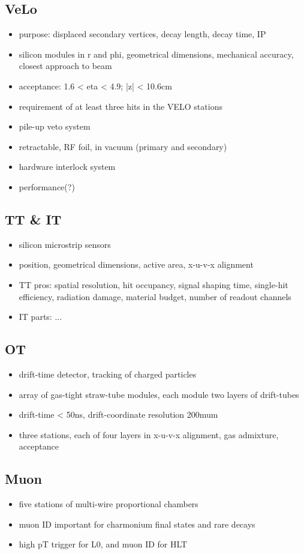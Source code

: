 \subsection{VeLo}
\begin{itemize}
  \item purpose: displaced secondary vertices, decay length, decay time, IP
  \item silicon modules in r and phi, geometrical dimensions, mechanical accuracy, closest approach to beam
  \item acceptance: 1.6 < eta < 4.9; |z| < 10.6cm
  \item requirement of at least three hits in the VELO stations
  \item pile-up veto system
  \item retractable, RF foil, in vacuum (primary and secondary)
  \item hardware interlock system
  \item performance(?)
\end{itemize}
\subsection{TT \& IT}
\begin{itemize}
  \item silicon microstrip sensors
  \item position, geometrical dimensions, active area, x-u-v-x alignment
  \item TT pros: spatial resolution, hit occupancy, signal shaping time, single-hit efficiency, radiation damage, material budget, number of readout channels
  \item IT parts: ...
\end{itemize}
\subsection{OT}
\begin{itemize}
  \item drift-time detector, tracking of charged particles
  \item array of gas-tight straw-tube modules, each module two layers of drift-tubes
  \item drift-time < 50ns, drift-coordinate resolution 200mum
  \item three stations, each of four layers in x-u-v-x alignment, gas admixture, acceptance
\end{itemize}
\subsection{Muon}
\begin{itemize}
  \item five stations of multi-wire proportional chambers
  \item muon ID important for charmonium final states and rare decays
  \item high pT trigger for L0, and muon ID for HLT
\end{itemize}
